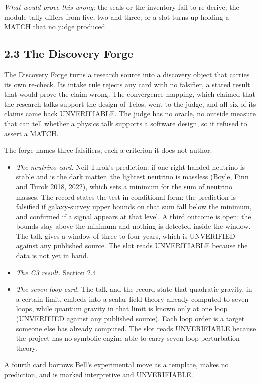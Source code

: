 \documentclass[11pt]{article}
\begin{document}
\emph{What would prove this wrong:} the seals or the inventory fail to re-derive; the module tally differs from five, two and three; or a slot turns up holding a MATCH that no judge produced.

\subsection*{2.3 The Discovery Forge}

The Discovery Forge turns a research source into a discovery object that carries its own re-check. Its intake rule rejects any card with no falsifier, a stated result that would prove the claim wrong. The convergence mapping, which claimed that the research talks support the design of Telos, went to the judge, and all six of its claims came back UNVERIFIABLE. The judge has no oracle, no outside measure that can tell whether a physics talk supports a software design, so it refused to assert a MATCH.

The forge names three falsifiers, each a criterion it does not author.

\begin{itemize}
\item \emph{The neutrino card.} Neil Turok's prediction: if one right-handed neutrino is stable and is the dark matter, the lightest neutrino is massless (Boyle, Finn and Turok 2018, 2022), which sets a minimum for the sum of neutrino masses. The record states the test in conditional form: the prediction is falsified if galaxy-survey upper bounds on that sum fall below the minimum, and confirmed if a signal appears at that level. A third outcome is open: the bounds stay above the minimum and nothing is detected inside the window. The talk gives a window of three to four years, which is UNVERIFIED against any published source. The slot reads UNVERIFIABLE because the data is not yet in hand.
\item \emph{The C3 result.} Section 2.4.
\item \emph{The seven-loop card.} The talk and the record state that quadratic gravity, in a certain limit, embeds into a scalar field theory already computed to seven loops, while quantum gravity in that limit is known only at one loop (UNVERIFIED against any published source). Each loop order is a target someone else has already computed. The slot reads UNVERIFIABLE because the project has no symbolic engine able to carry seven-loop perturbation theory.
\end{itemize}
A fourth card borrows Bell's experimental move as a template, makes no prediction, and is marked interpretive and UNVERIFIABLE.
\end{document}
